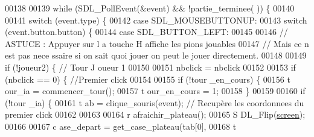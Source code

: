 \begin{DoxyCode}
00138 
00139                                 \textcolor{keywordflow}{while} (SDL\_PollEvent(&event) && !partie\_terminee(
      )) \{
00140 
00141                                         \textcolor{keywordflow}{switch} (event.type) \{
00142                                         \textcolor{keywordflow}{case} SDL\_MOUSEBUTTONUP:
00143                                                 \textcolor{keywordflow}{switch} (event.button.button) \{
00144                                                 \textcolor{keywordflow}{case} SDL\_BUTTON\_LEFT:
00145 
00146                                                         \textcolor{comment}{// ASTUCE : Appuyer sur l
      a touche H affiche les pions jouables}
00147                                                         \textcolor{comment}{// Mais ce n est pas nece
      ssaire si on sait quoi jouer on peut le jouer directement.}
00148 
00149                                                         \textcolor{keywordflow}{if} (!joueur2) \{ \textcolor{comment}{// Tour J
      oueur 1}
00150 
00151                                                                 nbclick = nbclick
00152 
00153                                                                 \textcolor{keywordflow}{if} (nbclick == 0)
       \{ \textcolor{comment}{//Premier click}
00154 
00155                                                                         \textcolor{keywordflow}{if} (!tour
      \_en\_cours) \{
00156                                                                                 t
      our\_ia = commencer\_tour();
00157                                                                                 t
      our\_en\_cours = 1;
00158                                                                         \}
00159 
00160                                                                         \textcolor{keywordflow}{if} (!tour
      \_ia) \{
00161                                                                                 t
      ab = clique\_souris(event); \textcolor{comment}{// Recupère les coordonnees du premier click}
00162 
00163 
00164                                                                                 r
      afraichir\_plateau();
00165                                                                                 S
      DL\_Flip(\hyperlink{fonction_interface_8h_a78fa3957d73de49cb81d047857504218}{screen});
00166 
00167                                                                                 c
      ase\_depart = get\_case\_plateau(tab[0],
00168                                                                                                 t

\end{DoxyCode}
